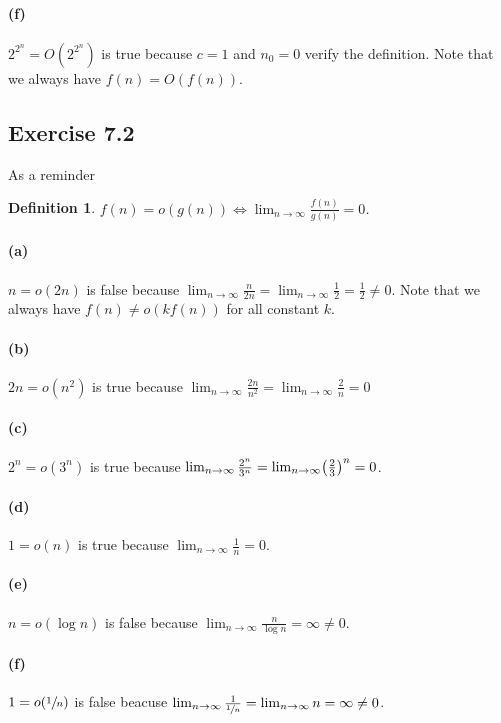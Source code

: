 \documentclass{article}
\newcommand{\definitionname}{Definition}
\newtheorem{definition}{\definitionname}
\begin{document}
\paragraph{(f)}
\(2^{2^n} = O(2^{2^n})\)
is true because \(c = 1\) and \(n_0 = 0\) verify the definition. Note that we
always have \(f(n) = O(f(n))\).

\subsection{Exercise 7.2}
As a reminder
\begin{definition}
	\(f(n) = o(g(n)) \iff \lim_{n \to \infty} \frac{f(n)}{g(n)} = 0\).
\end{definition}

\paragraph{(a)}
\(n = o(2n)\) is false because \(\lim_{n \to \infty} \frac{n}{2n} = \lim_{n \to
\infty} \frac{1}{2} = \frac{1}{2} \neq 0\). Note that we always have \(f(n)
\neq o(k f(n))\) for all constant \(k\).

\paragraph{(b)}
\(2n = o(n^2)\) is true because \(\lim_{n \to \infty} \frac{2n}{n^2} =
\lim_{n \to \infty} \frac{2}{n} = 0\)

\paragraph{(c)}
\(2^n = o(3^n)\) is true because \(\lim_{n \to \infty} \frac{2^n}{3^n} =
\lim_{n \to \infty} \mleft(\frac{2}{3}\mright)^n = 0\).

\paragraph{(d)}
\(1 = o(n)\) is true because \(\lim_{n \to \infty} \frac{1}{n} = 0\).

\paragraph{(e)}
\(n = o(\log n)\) is false because \(\lim_{n \to \infty} \frac{n}{\log n} =
\infty \neq 0\).

\paragraph{(f)}
\(1 = o(\sfrac{1}{n})\) is false beacuse \(\lim_{n \to \infty}
\frac{1}{\sfrac{1}{n}} = \lim_{n \to \infty} n = \infty \neq 0\).
\end{document}
